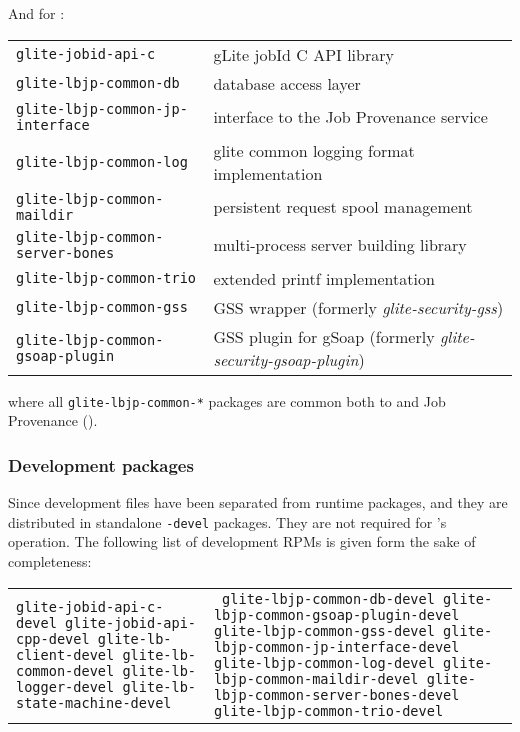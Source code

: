 \noindent
And for :

\nopagebreak
\begin{tabularx}{\textwidth}{>{\tt}lX}
glite-jobid-api-c & gLite jobId C API library \\ 
glite-lbjp-common-db & database access layer \\
glite-lbjp-common-jp-interface & interface to the Job Provenance service\\
glite-lbjp-common-log & glite common logging format implementation \\
glite-lbjp-common-maildir & persistent request spool management \\
glite-lbjp-common-server-bones & multi-process server building library \\
glite-lbjp-common-trio & extended printf implementation \\
glite-lbjp-common-gss & GSS wrapper (formerly \emph{glite-security-gss})\\
glite-lbjp-common-gsoap-plugin & GSS plugin for gSoap (formerly \emph{glite-security-gsoap-plugin})\\
\end{tabularx}

where all \verb'glite-lbjp-common-*' packages are common both to \LB and 
Job Provenance (\JP).

\subsubsection{Development packages}

Since  development files have been separated from runtime packages, and they are distributed in standalone \texttt{-devel} packages. They are not required for \LB's operation. The following list of development RPMs is given form the sake of completeness:

\begin{tabularx}{\textwidth}{>{\tt}p{6cm}>{\tt}X}
glite-jobid-api-c-devel 
glite-jobid-api-cpp-devel 
glite-lb-client-devel 
glite-lb-common-devel 
glite-lb-logger-devel 
glite-lb-state-machine-devel &
glite-lbjp-common-db-devel 
glite-lbjp-common-gsoap-plugin-devel 
glite-lbjp-common-gss-devel 
glite-lbjp-common-jp-interface-devel 
glite-lbjp-common-log-devel 
glite-lbjp-common-maildir-devel 
glite-lbjp-common-server-bones-devel 
glite-lbjp-common-trio-devel
\end{tabularx}

